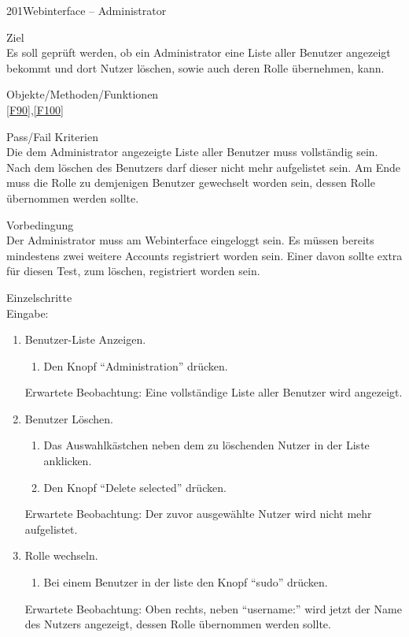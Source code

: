\begin{testcase}{201}{Webinterface -- Administrator}
\item[Ziel]~\\
Es soll geprüft werden, ob ein Administrator eine Liste aller Benutzer angezeigt bekommt und 
dort Nutzer löschen, sowie auch deren Rolle übernehmen, kann.
\item[Objekte/Methoden/Funktionen]~\\
\ref{F90},\ref{F100}
\item[Pass/Fail Kriterien]~\\
Die dem Administrator angezeigte Liste aller Benutzer muss vollständig sein.
Nach dem löschen des Benutzers darf dieser nicht mehr aufgelistet sein.
Am Ende muss die Rolle zu demjenigen Benutzer gewechselt worden sein, dessen Rolle übernommen werden sollte.
\item[Vorbedingung]~\\
Der Administrator muss am Webinterface eingeloggt sein.
Es müssen bereits mindestens zwei weitere Accounts registriert worden sein.
Einer davon sollte extra für diesen Test, zum löschen, registriert worden sein.
\item[Einzelschritte]~\\
Eingabe:
\begin{enumerate}
\item Benutzer-Liste Anzeigen.
\begin{enumerate}
\item Den Knopf "`Administration"' drücken.
\end{enumerate}
Erwartete Beobachtung: Eine vollständige Liste aller Benutzer wird angezeigt.
\item Benutzer Löschen.
\begin{enumerate}
\item Das Auswahlkästchen neben dem zu löschenden Nutzer in der Liste anklicken.
\item Den Knopf "`Delete selected"' drücken.
\end{enumerate}
Erwartete Beobachtung: Der zuvor ausgewählte Nutzer wird nicht mehr aufgelistet.
\item Rolle wechseln.
\begin{enumerate}
\item Bei einem Benutzer in der liste den Knopf "`sudo"' drücken.
\end{enumerate}
Erwartete Beobachtung: Oben rechts, neben "`username:"' wird jetzt der Name des Nutzers angezeigt, dessen Rolle übernommen werden sollte.
\end{enumerate}

\end{testcase}
